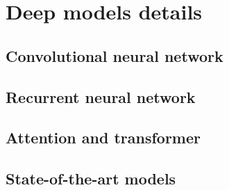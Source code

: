 \section{Deep models details}
\label{sec:Deep models details}
\subsection{Convolutional neural network}
\subsection{Recurrent neural network}
\subsection{Attention and transformer}

\subsection{State-of-the-art models}